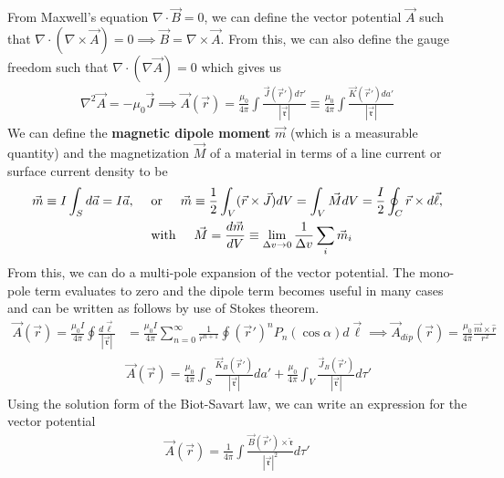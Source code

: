 From Maxwell's equation $\nabla \cdot \vec{B}=0$, we can define the vector potential $\vec{A}$ such that $\nabla \cdot (\nabla \times \vec{A}) = 0 \implies \vec{B} = \nabla \times \vec{A}$. From this, we can also define the gauge freedom such that $\nabla \cdot (\nabla \vec{A})=0$ which gives us
\begin{align}
	\nabla^2\vec{A} = -\mu_0 \vec{J} \implies \vec{A}(\vec{r}) = \frac{\mu_0}{4\pi}\int \frac{\vec{J}(\vec{r}')d\tau'}{|\vec{\mathfrak{r}}|} \equiv \frac{\mu_0}{4\pi}\int \frac{\vec{K}(\vec{r}')da'}{|\vec{\mathfrak{r}}|}
\end{align}
We can define the \textbf{magnetic dipole moment} $\vec{m}$ (which is a measurable quantity) and the magnetization $\vec{M}$ of a material in terms of a line current or surface current density to be
\begin{align}
	\vec{m} \equiv I \int_S d\vec{a} = I\vec{a}, \hspace{0.5cm}&\textrm{or}\hspace{0.5cm} \vec{m} \equiv \frac{1}{2}\int_V(\vec{r}\times \vec{J})dV= \int_V \vec{M}  dV = \frac{I}{2}\oint_C \vec{r}\times d\vec{\ell}, \\ &\textrm{with}\hspace{0.5cm} \vec{M} = \frac{d\vec{m}}{dV} \equiv \lim\limits_{\Delta v \rightarrow 0}\frac{1}{\Delta v}\sum_{i}\vec{m}_i 
\end{align} 
From this, we can do a multi-pole expansion of the vector potential. The mono-pole term evaluates to zero and the dipole term becomes useful in many cases and can be written as follows by use of Stokes theorem.
\begin{align}
	\vec{A}(\vec{r}) = \frac{\mu_0 I}{4\pi}\oint\frac{d\vec{\ell}}{|\vec{\mathfrak{r}}|} &= \frac{\mu_0 I}{4\pi}\sum_{n=0}^{\infty}\frac{1}{r^{n+1}}\oint(\vec{r}')^nP_n(\cos\alpha)
	d\vec{\ell}\implies \vec{A}_{dip}(\vec{r}) = \frac{\mu_0}{4\pi}\frac{\vec{m}\times\hat{r}}{r^2} \\
	&\vec{A}(\vec{r})=\frac{\mu_0}{4\pi}\int_S\frac{\vec{K}_B(\vec{r}')}{|\vec{\mathfrak{r}}|}da'+\frac{\mu_0}{4\pi}\int_V\frac{\vec{J}_B(\vec{r}')}{|\vec{\mathfrak{r}}|}d\tau'
\end{align}
Using the solution form of the Biot-Savart law, we can write an expression for the vector potential
\begin{align}
	\vec{A}(\vec{r}) = \frac{1}{4\pi}\int\frac{\vec{B}(\vec{r}')\times \hat{\mathfrak{r}}}{|\vec{\mathfrak{r}}|^2}d\tau'
\end{align}
